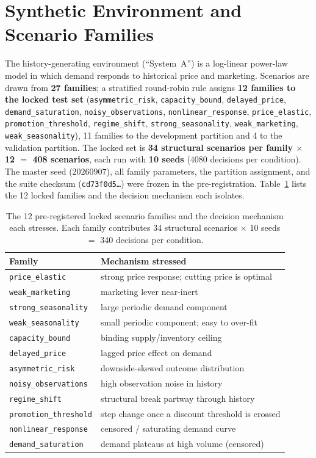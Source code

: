 \documentclass[conference]{IEEEtran}
\newcommand{\code}[1]{\texttt{#1}}
\begin{document}
\section{Synthetic Environment and Scenario Families}\label{sec:env}
The history-generating environment (``System~A'') is a log-linear power-law
model in which demand responds to historical price and marketing. Scenarios are
drawn from \textbf{27 families}; a stratified round-robin rule assigns
\textbf{12 families to the locked test set}
(\code{asymmetric\_risk}, \code{capacity\_bound}, \code{delayed\_price},
\code{demand\_saturation}, \code{noisy\_observations}, \code{nonlinear\_response},
\code{price\_elastic}, \code{promotion\_threshold}, \code{regime\_shift},
\code{strong\_seasonality}, \code{weak\_marketing}, \code{weak\_seasonality}),
11 families to the development partition and 4 to the validation partition. The
locked set is
\textbf{34 structural scenarios per family $\times$ 12 $=$ 408 scenarios},
each run with \textbf{10 seeds} ($4080$ decisions per condition). The master
seed ($20260907$), all family parameters, the partition assignment, and the
suite checksum (\code{cd73f0d5\ldots}) were frozen in the pre-registration.
Table~\ref{tab:families} lists the 12 locked families and the decision mechanism
each isolates.

\begin{table}[!t]
\caption{The 12 pre-registered locked scenario families and the decision
mechanism each stresses. Each family contributes 34 structural scenarios
$\times$ 10 seeds $=$ 340 decisions per condition.}
\label{tab:families}
\centering
\begin{tabular}{ll}
\toprule
Family & Mechanism stressed \\
\midrule
\code{price\_elastic}       & strong price response; cutting price is optimal \\
\code{weak\_marketing}      & marketing lever near-inert \\
\code{strong\_seasonality}  & large periodic demand component \\
\code{weak\_seasonality}    & small periodic component; easy to over-fit \\
\code{capacity\_bound}      & binding supply/inventory ceiling \\
\code{delayed\_price}       & lagged price effect on demand \\
\code{asymmetric\_risk}     & downside-skewed outcome distribution \\
\code{noisy\_observations}  & high observation noise in history \\
\code{regime\_shift}        & structural break partway through history \\
\code{promotion\_threshold} & step change once a discount threshold is crossed \\
\code{nonlinear\_response}  & censored / saturating demand curve \\
\code{demand\_saturation}   & demand plateaus at high volume (censored) \\
\bottomrule
\end{tabular}
\end{table}
\end{document}
